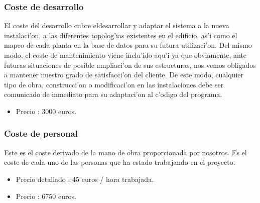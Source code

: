 \subsubsection{Coste de desarrollo}
El coste del desarrollo cubre eldesarrollar y adaptar el sistema a la nueva instalaci'on, a las diferentes topolog'ias existentes en el edificio, as'i como el mapeo de cada planta en la base de datos para su futura utilizaci'on. Del mismo modo, el coste de mantenimiento viene inclu'ido aqu'i ya que obviamente, ante futuras situaciones de posible ampliaci'on de sus estructuras, nos vemos obligados a mantener nuestro grado de satisfacci'on del cliente. De este modo, cualquier tipo de obra, construcci'on o modificaci'on en las instalaciones debe ser comunicado de inmediato para su adaptaci'on al c'odigo del programa.
\begin{itemize}
\item Precio : 3000 euros.
\end{itemize}

\subsubsection{Coste de personal}
Este es el coste derivado de la mano de obra proporcionada por nosotros. Es el coste de cada uno de las personas que ha estado 
trabajando en el proyecto.
\begin{itemize}
\item Precio detallado : 45 euros / hora trabajada.
\item Precio : 6750 euros.

\end{itemize}


